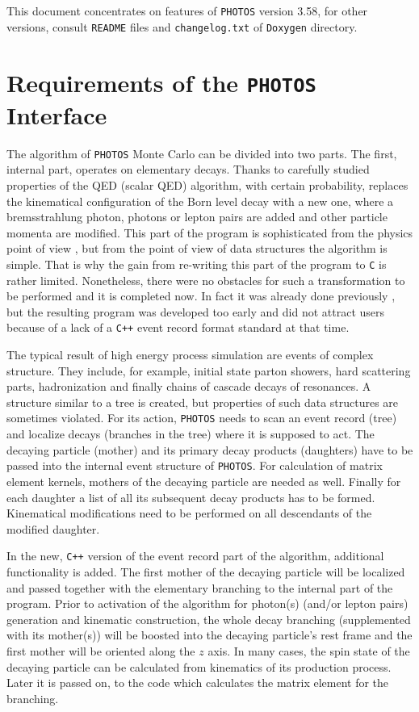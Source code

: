 \documentclass[]{Photos_interface_design}
\begin{document}
This document concentrates on features of {\tt PHOTOS} version 3.58, for 
other versions, consult {\tt README} files and {\tt changelog.txt} of {\tt Doxygen} directory.

\section{Requirements of the {\tt PHOTOS} Interface}
\label{sec:requrements}
The algorithm of {\tt PHOTOS} Monte Carlo can be divided into two parts.
The first, internal part, operates on elementary decays. Thanks to carefully 
studied properties of the 
QED (scalar QED) algorithm, with certain probability, 
replaces the kinematical configuration of the Born level decay with a new one, 
where a bremsstrahlung photon, photons or lepton pairs
are added and other particle momenta are modified. This part of the program is sophisticated from the physics 
point of view \cite{Golonka:2006tw,Nanava:2006vv},
but from the point of view of data structures the algorithm is simple.
That is why the gain from re-writing this part of the program to {\tt C} is rather
limited. Nonetheless, there were no obstacles for such a transformation to be
performed and it is completed now. In fact it was already done
previously \cite{photosplus}, but the resulting program was developed too early 
and did not attract users because of a lack of a {\tt C++} event record format standard at that time.

The typical result of high energy process simulation are events of complex structure.
They include, for example, initial state parton showers, hard scattering parts,
hadronization and finally chains of cascade decays of resonances. 
A structure similar to a tree is created, but properties of such data structures
are sometimes violated.
For its action, {\tt PHOTOS} needs to scan an event record (tree) 
and localize decays (branches in the tree) where
it is supposed to act. The decaying particle (mother) and its primary decay products
(daughters) have to be passed into the internal event structure of {\tt PHOTOS}.
For calculation of matrix element kernels, mothers of the decaying particle are needed as well. 
Finally for each daughter a list of all its subsequent decay products has to be 
formed. Kinematical modifications need to be performed on all descendants of the modified daughter.

In the new, {\tt C++} version of the event record part of the algorithm, additional functionality
is added.
The first mother of the decaying particle will be localized and passed together with  
the elementary branching to the internal part of the program. 
Prior to activation of the algorithm for  photon(s) (and/or lepton pairs) generation and kinematic construction,
 the whole decay branching 
(supplemented with its mother(s))
will be boosted into the decaying particle's rest frame and the first mother
will be oriented along the $z$ axis. 
In many cases, the spin state of the decaying particle  can be calculated from kinematics of its production process.
Later it is passed on, to the code which calculates the matrix element for the branching.
\end{document}
